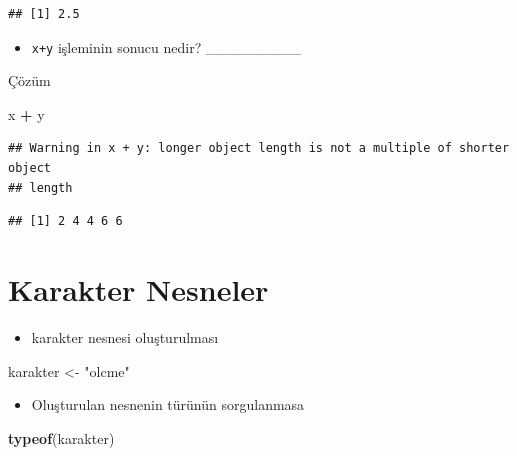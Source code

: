 \documentclass[
  oneside]{book}
\newenvironment{Shaded}{\begin{snugshade}}{\end{snugshade}}
\newcommand{\FunctionTok}[1]{\textcolor[rgb]{0.13,0.29,0.53}{\textbf{#1}}}
\newcommand{\NormalTok}[1]{#1}
\newcommand{\OtherTok}[1]{\textcolor[rgb]{0.56,0.35,0.01}{#1}}
\newcommand{\SpecialCharTok}[1]{\textcolor[rgb]{0.81,0.36,0.00}{\textbf{#1}}}
\newcommand{\StringTok}[1]{\textcolor[rgb]{0.31,0.60,0.02}{#1}}
\providecommand{\tightlist}{%
  \setlength{\itemsep}{0pt}\setlength{\parskip}{0pt}}
\begin{document}
\begin{verbatim}
## [1] 2.5
\end{verbatim}

\begin{itemize}
\tightlist
\item
  \texttt{x+y} işleminin sonucu nedir? \_\_\_\_\_\_\_\_\_
\end{itemize}

Çözüm

\begin{Shaded}
\begin{Highlighting}[]
\NormalTok{x }\SpecialCharTok{+}\NormalTok{ y}
\end{Highlighting}
\end{Shaded}

\begin{verbatim}
## Warning in x + y: longer object length is not a multiple of shorter object
## length
\end{verbatim}

\begin{verbatim}
## [1] 2 4 4 6 6
\end{verbatim}

\hypertarget{karakter-nesneler}{%
\section{Karakter Nesneler}\label{karakter-nesneler}}

\begin{itemize}
\tightlist
\item
  karakter nesnesi oluşturulması
\end{itemize}

\begin{Shaded}
\begin{Highlighting}[]
\NormalTok{karakter }\OtherTok{\textless{}{-}} \StringTok{"olcme"}
\end{Highlighting}
\end{Shaded}

\begin{itemize}
\tightlist
\item
  Oluşturulan nesnenin türünün sorgulanmasa
\end{itemize}

\begin{Shaded}
\begin{Highlighting}[]
\FunctionTok{typeof}\NormalTok{(karakter)}
\end{Highlighting}
\end{Shaded}
\end{document}
